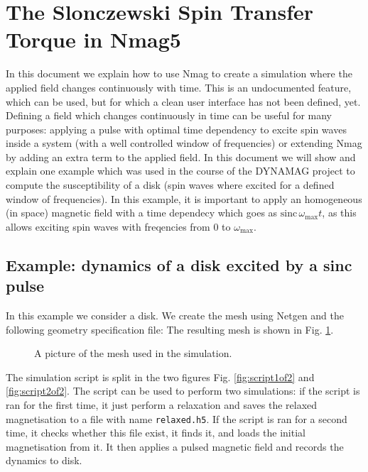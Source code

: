 \documentclass[11pt,oneside,openany]{article}
\author{Matteo Franchin}
\begin{document}
\titlepage

\section{The Slonczewski Spin Transfer Torque in Nmag5}
In this document we explain how to use Nmag to create a simulation where
the applied field changes continuously with time.
This is an undocumented feature, which can be used, but for which a clean
user interface has not been defined, yet.
Defining a field which changes continuously in time can be useful for many
purposes: applying a pulse with optimal time dependency to excite spin waves
inside a system (with a well controlled window of frequencies) or extending
Nmag by adding an extra term to the applied field.
In this document we will show and explain one example which was used
in the course of the DYNAMAG project to compute the susceptibility
of a disk (spin waves where excited for a defined window of frequencies).
In this example, it is important to apply an homogeneous (in space) magnetic
field with a time dependecy which goes as
$\mathrm{sinc} \, \omega_{\mathrm{max}} t$,
as this allows exciting spin waves with freqencies from 0 to
$\omega_{\mathrm{max}}$.


\subsection{Example: dynamics of a disk excited by a sinc pulse}
In this example we consider a disk. We create the mesh using Netgen and
the following geometry specification file:
%
%
%
The resulting mesh is shown in Fig. \ref{fig:mesh}.
%
\begin{figure}[h]
\begin{center}
\caption[Sketch]{A picture of the mesh used in the simulation.}
\label{fig:mesh}
\end{center}
\end{figure}
%
The simulation script is split in the two figures Fig. \ref{fig:script1of2} and
\ref{fig:script2of2}.  The script can be used to perform two simulations: if
the script is ran for the first time, it just perform a relaxation and saves
the relaxed magnetisation to a file with name \verb|relaxed.h5|. If the script
is ran for a second time, it checks whether this file exist, it finds it, and
loads the initial magnetisation from it. It then applies a pulsed magnetic
field and records the dynamics to disk.
\end{document}
